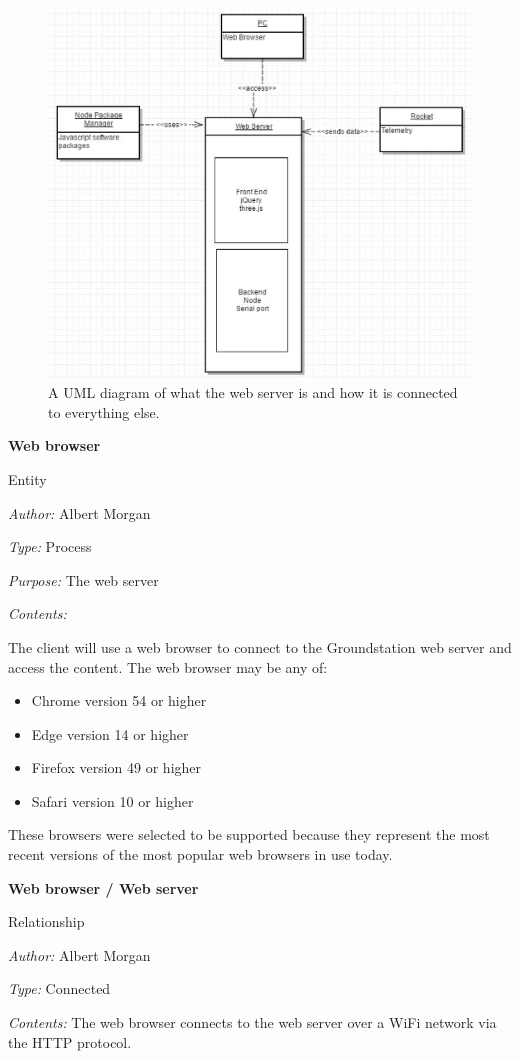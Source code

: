 \documentclass[10pt,draftclsnofoot,onecolumn]{IEEEtran}
\newcommand{\newentity}[5]{

	\noindent\textbf{#2}
	
	\noindent Entity
	
	\noindent\textit{Author:} {#1}
		
	\noindent\textit{Type:} {#3}
	
	\noindent\textit{Purpose:} {#4}

	\noindent\textit{Contents:} {#5}
	\vspace{.5cm}

}
\newcommand{\newrelationship}[4]{
	\noindent\textbf{#2}
	
	\noindent Relationship
	
	\noindent\textit{Author:} #1

	\noindent\textit{Type:} #3

	\noindent\textit{Contents:} #4

	\vspace{.5cm}
}
\begin{document}
	\begin{center}
	\begin{figure}[thbp!]
		\centering\includegraphics[width=170mm]{UMLdiagram1.eps}
		\caption{A UML diagram of what the web server is and how it is connected to everything else.}
		\label{uml4}
	\end{figure}
	\end{center}
	\clearpage
	\newentity
	{Albert Morgan}
	{Web browser}
	{Process}
	{The web server}
	{	The client will use a web browser to connect to the Groundstation web server and access the content.
		The web browser may be any of:
		\begin{itemize}
			\item Chrome version 54 or higher
			\item Edge version 14 or higher
			\item Firefox version 49 or higher
			\item Safari version 10 or higher
		\end{itemize}
		These browsers were selected to be supported because they represent the most recent versions of the most popular web browsers in use today.
	}

	\newrelationship
	{Albert Morgan}
	{Web browser / Web server}
	{Connected}
	{The web browser connects to the web server over a WiFi network via the HTTP protocol.}
	
\end{document}
